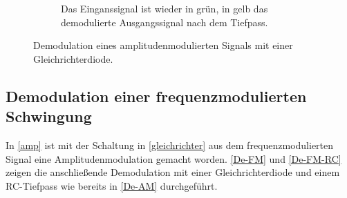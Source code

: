 \begin{figure}[t!]
\begin{subfigure}[t]{0.5\textwidth}
		\caption{Das Einganssignal ist wieder in grün, in gelb das demodulierte Ausgangssignal nach dem Tiefpass.}
		\label{nachRC}
	\end{subfigure}
	\caption{Demodulation eines amplitudenmodulierten Signals mit einer Gleichrichterdiode.}
\end{figure}

\subsection{Demodulation einer frequenzmodulierten Schwingung}

In \autoref{amp} ist mit der Schaltung in \autoref{gleichrichter} aus dem frequenzmodulierten Signal eine Amplitudenmodulation gemacht worden. \autoref{De-FM} und \autoref{De-FM-RC} zeigen die anschließende Demodulation mit einer Gleichrichterdiode und einem RC-Tiefpass wie bereits in \autoref{De-AM} durchgeführt.

